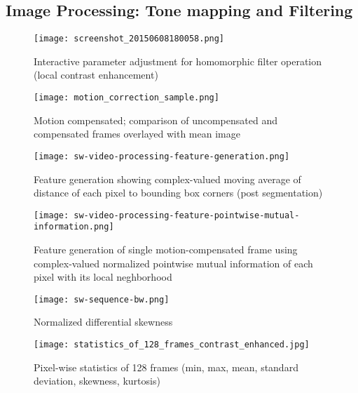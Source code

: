 \documentclass[../main.tex]{subfiles}
\begin{document}
\subsection{Image Processing: Tone mapping and
	Filtering}\label{sec:image-processing-tonemapping-and-filtering}

\begin{figure}[htb]\centering
	\texttt{[image: screenshot\_20150608180058.png]}
	\caption{Interactive parameter adjustment for homomorphic filter operation (local contrast enhancement)}
\end{figure}

\begin{figure}[htb]\centering
	\texttt{[image: motion\_correction\_sample.png]}
	\caption{Motion compensated; comparison of uncompensated and compensated frames overlayed with mean image}
\end{figure}

\begin{figure}[htb]\centering
	\texttt{[image: sw-video-processing-feature-generation.png]}
	\caption{Feature generation showing complex-valued moving average of distance of each pixel to bounding box corners (post segmentation)}
\end{figure}


\begin{figure}[htb]\centering
	\texttt{[image: sw-video-processing-feature-pointwise-mutual-information.png]}
	\caption{Feature generation of single motion-compensated frame using complex-valued normalized pointwise mutual information of each pixel with its local neghborhood}
\end{figure}

\begin{figure}[htb]\centering
	\texttt{[image: sw-sequence-bw.png]}
	\caption{Normalized differential skewness}
\end{figure}


\begin{figure}[htb]\centering
	\texttt{[image: statistics\_of\_128\_frames\_contrast\_enhanced.jpg]}
	\caption{Pixel-wise statistics of 128 frames (min, max, mean, standard deviation, skewness, kurtosis)}
\end{figure}

\clearpage
\end{document}
